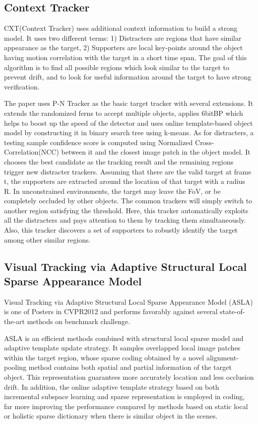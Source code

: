 \documentclass{acm_proc_article-sp}
\begin{document}
\subsection{Context Tracker}
    CXT(Context Tracker) uses additional context information to build a strong model. It uses two different terms: 1) Distracters are regions that have similar appearance as the target, 2) Supporters are local key-points around the object having motion correlation with the target in a short time span. The goal of this algorithm is to find all possible regions which look similar to the target to prevent drift, and to look for useful information around the target to have strong verification.
    
    The paper uses P-N Tracker as the basic target tracker with several extensions. It extends the randomized ferns to accept multiple objects, applies 6bitBP which helps to boost up the speed of the detector and uses online template-based object model by constructing it in binary search tree using k-means.
    \newline
    As for distracters, a testing sample confidence score is computed using Normalized Cross-Correlation(NCC) between it and the closest image patch in the object model. It chooses the best candidate as the tracking result and the remaining regions trigger new distracter trackers.
    \newline
    Assuming that there are the valid target at frame t, the supporters are extracted around the location of that target with a radius R.
    \newline
    In unconstrained environments, the target may leave the FoV, or be completely occluded by other objects. The common trackers will simply switch to another region satisfying the threshold. Here, this tracker automatically exploits all the distracters and pays attention to them by tracking them simultaneously. Also, this tracker discovers a set of supporters to robustly identify the target among other similar regions.

\subsection{Visual Tracking via Adaptive Structural Local Sparse Appearance Model}
Visual Tracking via Adaptive Structural Local Sparse Appearance Model (ASLA) is one of Posters in CVPR2012 and performs favorably against several state-of-the-art methods on benchmark challenge.

ASLA is an efficient methods combined with structural local sparse model and adaptive template update strategy. It samples overlapped local image patches within the target region, whose sparse coding obtained by a novel alignment-pooling method contains both spatial and partial information of the target object. This representation guarantees more accurately location and less occlusion drift. In addition, the online adaptive template strategy based on both incremental subspace learning and sparse representation is employed in coding, far more improving the performance compared by methods based on static local or holistic sparse dictionary when there is similar object in the scenes.
\end{document}
